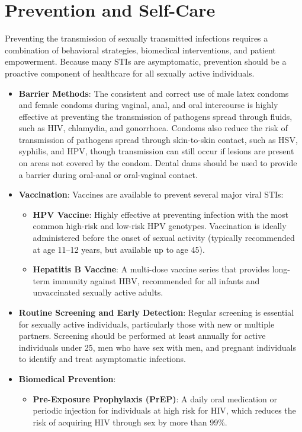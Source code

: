 \section*{Prevention and Self-Care}
Preventing the transmission of sexually transmitted infections requires a combination of behavioral strategies, biomedical interventions, and patient empowerment. Because many STIs are asymptomatic, prevention should be a proactive component of healthcare for all sexually active individuals.

\begin{itemize}
    \item \textbf{Barrier Methods}: The consistent and correct use of male latex condoms and female condoms during vaginal, anal, and oral intercourse is highly effective at preventing the transmission of pathogens spread through fluids, such as HIV, chlamydia, and gonorrhoea. Condoms also reduce the risk of transmission of pathogens spread through skin-to-skin contact, such as HSV, syphilis, and HPV, though transmission can still occur if lesions are present on areas not covered by the condom. Dental dams should be used to provide a barrier during oral-anal or oral-vaginal contact.
    \item \textbf{Vaccination}: Vaccines are available to prevent several major viral STIs:
    \begin{itemize}
        \item \textbf{HPV Vaccine}: Highly effective at preventing infection with the most common high-risk and low-risk HPV genotypes. Vaccination is ideally administered before the onset of sexual activity (typically recommended at age 11--12 years, but available up to age 45).
        \item \textbf{Hepatitis B Vaccine}: A multi-dose vaccine series that provides long-term immunity against HBV, recommended for all infants and unvaccinated sexually active adults.
    \end{itemize}
    \item \textbf{Routine Screening and Early Detection}: Regular screening is essential for sexually active individuals, particularly those with new or multiple partners. Screening should be performed at least annually for active individuals under 25, men who have sex with men, and pregnant individuals to identify and treat asymptomatic infections.
    \item \textbf{Biomedical Prevention}:
    \begin{itemize}
        \item \textbf{Pre-Exposure Prophylaxis (PrEP)}: A daily oral medication or periodic injection for individuals at high risk for HIV, which reduces the risk of acquiring HIV through sex by more than 99\%.

\end{itemize}
\end{itemize}
